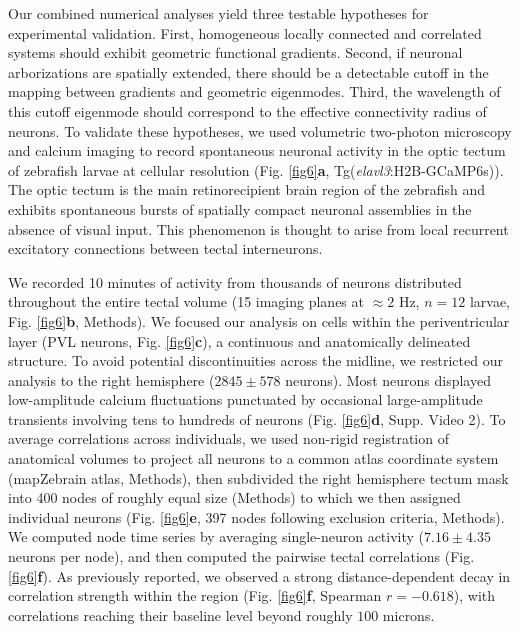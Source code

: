 \documentclass{article}
\begin{document}
Our combined numerical analyses yield three testable hypotheses for experimental validation. First, homogeneous locally connected and correlated systems should exhibit geometric functional gradients. Second, if neuronal arborizations are spatially extended, there should be a detectable cutoff in the mapping between gradients and geometric eigenmodes. Third, the wavelength of this cutoff eigenmode should correspond to the effective connectivity radius of neurons. To validate these hypotheses, we used volumetric two-photon microscopy and calcium imaging to record spontaneous neuronal activity in the optic tectum of zebrafish larvae at cellular resolution (Fig. \ref{fig6}\textbf{a}, Tg(\textit{elavl3}:H2B-GCaMP6s)\cite{vladimirov2014light}). The optic tectum is the main retinorecipient brain region of the zebrafish\cite{baier2024visual} and exhibits spontaneous bursts of spatially compact neuronal assemblies in the absence of visual input\cite{avitan2017spontaneous, marachlian2018principles}. This phenomenon is thought to arise from local recurrent excitatory connections between tectal interneurons\cite{zylbertal2023recurrent}.

We recorded 10 minutes of activity from thousands of neurons distributed throughout the entire tectal volume (15 imaging planes at $\approx2$ Hz, $n=12$ larvae, Fig. \ref{fig6}\textbf{b}, Methods). We focused our analysis on cells within the periventricular layer (PVL neurons, Fig. \ref{fig6}\textbf{c}), a continuous and anatomically delineated structure. To avoid potential discontinuities across the midline, we restricted our analysis to the right hemisphere ($2845\pm578$ neurons). Most neurons displayed low-amplitude calcium fluctuations punctuated by occasional large-amplitude transients involving tens to hundreds of neurons (Fig. \ref{fig6}\textbf{d}, Supp. Video 2). To average correlations across individuals, we used non-rigid registration of anatomical volumes\cite{avants2009advanced} to project all neurons to a common atlas coordinate system (mapZebrain atlas\cite{kunst2019cellular}, Methods), then subdivided the right hemisphere tectum mask into 400 nodes of roughly equal size (Methods) to which we then assigned individual neurons (Fig. \ref{fig6}\textbf{e}, 397 nodes following exclusion criteria, Methods). We computed node time series by averaging single-neuron activity ($7.16\pm4.35$ neurons per node), and then computed the pairwise tectal correlations (Fig. \ref{fig6}\textbf{f}). As previously reported\cite{zylbertal2023recurrent}, we observed a strong distance-dependent decay in correlation strength within the region (Fig. \ref{fig6}\textbf{f}, Spearman $r=-0.618$), with correlations reaching their baseline level beyond roughly $100$ microns. 
\end{document}
